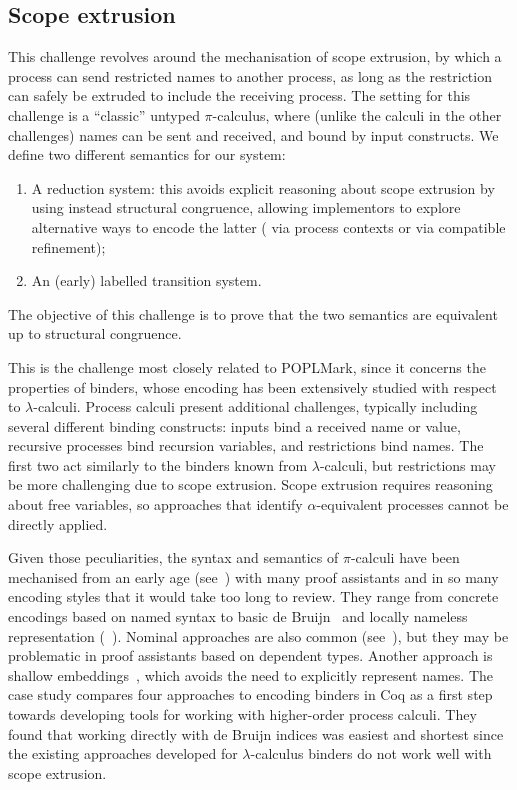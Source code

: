 \documentclass[runningheads]{llncs}
\begin{document}
\subsection{Scope extrusion}
This challenge revolves around the mechanisation of scope
extrusion, by which a process can send restricted names to another
process, as long as the restriction can safely be extruded to include
the receiving process.  The setting for this challenge is a
``classic'' untyped \( \pi \)-calculus, where (unlike the calculi in
the other challenges) names can be sent and received, and bound by
input constructs.  We define two different semantics for our system:
\begin{enumerate}
\item A reduction system: this avoids explicit reasoning about scope
  extrusion by using instead structural congruence, allowing
  implementors to explore alternative ways to encode the latter (\eg
  via process contexts or via compatible refinement);
\item An (early) labelled transition system.
\end{enumerate}
The objective of this
challenge is to prove that the two semantics are equivalent up to
structural congruence.

This is the challenge most closely related to POPLMark,
since it concerns the properties of binders, whose encoding has been
extensively studied with respect to $\lambda$-calculi. Process calculi
present additional challenges, typically including several
different binding constructs: inputs bind a received name or value,
recursive processes bind recursion variables, and restrictions bind
names. The first two act similarly to the binders known from
$\lambda$-calculi, but restrictions may be more challenging due to
scope extrusion.
Scope extrusion requires reasoning about free variables, so approaches that identify \(\alpha\)-equivalent processes cannot be directly applied.

Given those peculiarities, the syntax and semantics of $\pi$-calculi have been
mechanised from an early age (see~\cite{Melham1994}) with many proof
assistants and in so many encoding styles that it would take too long to
review.
They range from concrete encodings based on named syntax
\cite{Melham1994} to basic de Bruijn~\cite{Hirschkoff1997, Perera2018} and locally nameless
representation %
(\eg~\cite{Castro2020}).
Nominal approaches are also common (see~\cite{Bengtson2009}), but they
may be problematic in proof assistants based on dependent types.
Another approach is shallow embeddings~\cite{Castro-Perez2021}, which avoids the need to explicitly represent names.
The case study \cite{AmbalLS21} compares four approaches to encoding
binders in Coq as a first step towards developing tools for working
with higher-order process calculi.  They found that working directly
with de Bruijn indices was easiest and shortest since the existing
approaches developed for $\lambda$-calculus binders do not work well
with scope extrusion.
\end{document}

